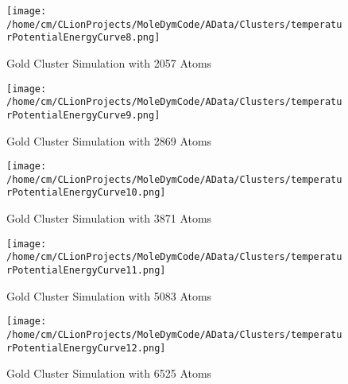 \begin{figure}[!h] 
    \begin{center} 
        \texttt{[image: /home/cm/CLionProjects/MoleDymCode/AData/Clusters/temperaturPotentialEnergyCurve8.png]} 
    \end{center} 
    \caption[Gold Cluster Simulation with 2057 Atoms]{Gold Cluster Simulation with 2057 Atoms} 
    \label{GoldClusterSimulationTemperaturEnergy2057} 
\end{figure} 
 
\begin{figure}[!h] 
    \begin{center} 
        \texttt{[image: /home/cm/CLionProjects/MoleDymCode/AData/Clusters/temperaturPotentialEnergyCurve9.png]} 
    \end{center} 
    \caption[Gold Cluster Simulation with 2869 Atoms]{Gold Cluster Simulation with 2869 Atoms} 
    \label{GoldClusterSimulationTemperaturEnergy2869} 
\end{figure} 
 
\begin{figure}[!h] 
    \begin{center} 
        \texttt{[image: /home/cm/CLionProjects/MoleDymCode/AData/Clusters/temperaturPotentialEnergyCurve10.png]} 
    \end{center} 
    \caption[Gold Cluster Simulation with 3871 Atoms]{Gold Cluster Simulation with 3871 Atoms} 
    \label{GoldClusterSimulationTemperaturEnergy3871} 
\end{figure} 
 
\begin{figure}[!h] 
    \begin{center} 
        \texttt{[image: /home/cm/CLionProjects/MoleDymCode/AData/Clusters/temperaturPotentialEnergyCurve11.png]} 
    \end{center} 
    \caption[Gold Cluster Simulation with 5083 Atoms]{Gold Cluster Simulation with 5083 Atoms} 
    \label{GoldClusterSimulationTemperaturEnergy5083} 
\end{figure} 
 
\begin{figure}[!h] 
    \begin{center} 
        \texttt{[image: /home/cm/CLionProjects/MoleDymCode/AData/Clusters/temperaturPotentialEnergyCurve12.png]} 
    \end{center} 
    \caption[Gold Cluster Simulation with 6525 Atoms]{Gold Cluster Simulation with 6525 Atoms} 
    \label{GoldClusterSimulationTemperaturEnergy6525} 
\end{figure} 
 
